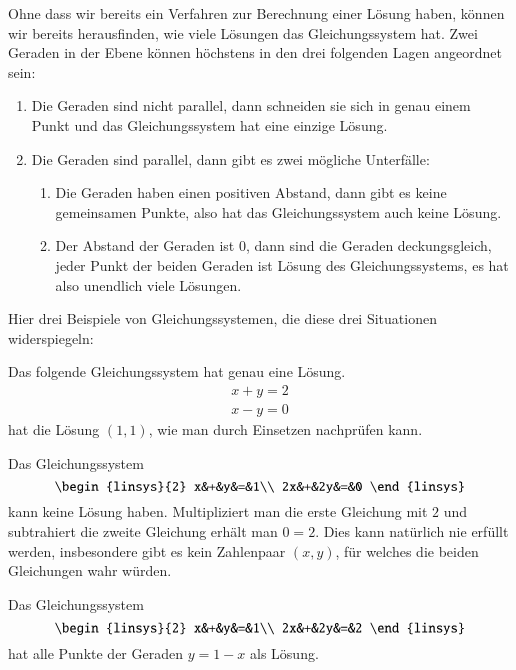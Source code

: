 Ohne dass wir bereits ein Verfahren zur Berechnung einer
Lösung haben, können wir bereits herausfinden, wie viele
Lösungen das Gleichungssystem hat.
Zwei Geraden in der Ebene
können höchstens in den drei folgenden Lagen angeordnet sein:
\begin{enumerate}
\item Die Geraden sind nicht parallel, dann schneiden sie sich in
genau einem Punkt und das Gleichungssystem hat eine einzige Lösung.
\item Die Geraden sind parallel, dann gibt es zwei mögliche Unterfälle:
\begin{enumerate}
\item Die Geraden haben einen positiven Abstand, dann gibt es keine
gemeinsamen Punkte, also hat das Gleichungssystem auch keine Lösung.
\item Der Abstand der Geraden ist $0$, dann sind die Geraden deckungsgleich,
jeder Punkt der beiden Geraden ist Lösung des Gleichungssystems, es hat
also unendlich viele Lösungen.
\end{enumerate}
\end{enumerate}
Hier drei Beispiele von Gleichungssystemen, die diese drei Situationen
widerspiegeln:
\begin{beispiel}
Das folgende Gleichungssystem hat genau eine Lösung.
\begin{align*}
x+y=2\\
x-y=0
\end{align*}
hat die Lösung $(1,1)$, wie man durch Einsetzen nachprüfen kann.
\end{beispiel}
\begin{beispiel}
Das Gleichungssystem
\[
\begin{linsys}{2}
x&+&y&=&1\\
2x&+&2y&=&0
\end{linsys}
\]
kann keine Lösung haben.
Multipliziert man die erste Gleichung mit $2$
und subtrahiert die zweite Gleichung erhält man $0=2$.
Dies kann natürlich
nie erfüllt werden, insbesondere gibt es kein Zahlenpaar $(x,y)$, für
welches die beiden Gleichungen wahr würden.
\end{beispiel}
\begin{beispiel}
Das Gleichungssystem
\[
\begin{linsys}{2}
x&+&y&=&1\\
2x&+&2y&=&2
\end{linsys}
\]
hat alle Punkte der Geraden $y=1-x$ als Lösung.
\end{beispiel}

